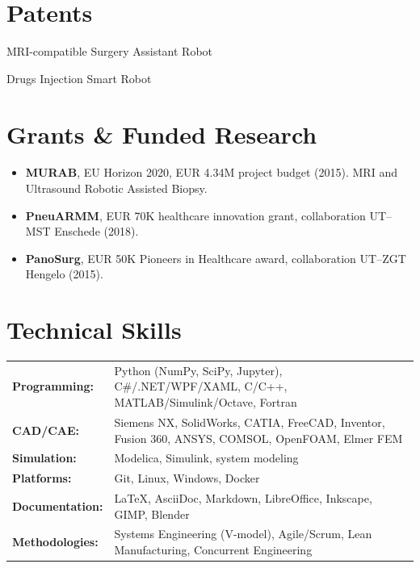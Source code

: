 \documentclass[11pt,a4paper]{article}
\begin{document}
\section{Patents}

\begin{enumerate}[label={[P\arabic*]}]
 \item MRI-compatible Surgery Assistant Robot
 \item Drugs Injection Smart Robot
\end{enumerate}

\section{Grants \& Funded Research}

\begin{itemize}
 \item \textbf{MURAB}, EU Horizon 2020, EUR 4.34M project budget (2015). MRI and Ultrasound Robotic Assisted Biopsy.
 \item \textbf{PneuARMM}, EUR 70K healthcare innovation grant, collaboration UT--MST Enschede (2018).
 \item \textbf{PanoSurg}, EUR 50K Pioneers in Healthcare award, collaboration UT--ZGT Hengelo (2015).
\end{itemize}

\section{Technical Skills}

\begin{tabularx}{\textwidth}{@{}lX@{}}
 \textbf{Programming:}  & Python (NumPy, SciPy, Jupyter), C\#/.NET/WPF/XAML, C/C++, MATLAB/Simulink/Octave, Fortran \\
 \textbf{CAD/CAE:}    & Siemens NX, SolidWorks, CATIA, FreeCAD, Inventor, Fusion 360, ANSYS, COMSOL, OpenFOAM, Elmer FEM \\
 \textbf{Simulation:}   & Modelica, Simulink, system modeling \\
 \textbf{Platforms:}   & Git, Linux, Windows, Docker \\
 \textbf{Documentation:} & \LaTeX, AsciiDoc, Markdown, LibreOffice, Inkscape, GIMP, Blender \\
 \textbf{Methodologies:} & Systems Engineering (V-model), Agile/Scrum, Lean Manufacturing, Concurrent Engineering \\
\end{tabularx}
\end{document}
